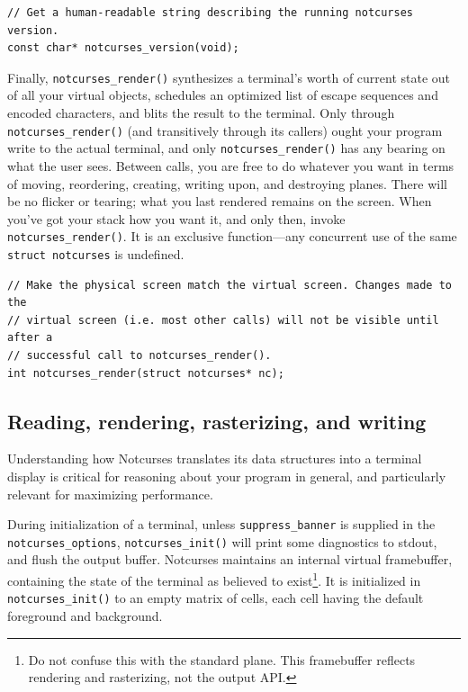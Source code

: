 \documentclass[letterpaper,10pt]{article}
\begin{document}
\begin{listing}[!htbp]
\begin{verbatim}
// Get a human-readable string describing the running notcurses version.
const char* notcurses_version(void);
\end{verbatim}
\end{listing}

Finally, \texttt{notcurses\_render()} synthesizes a terminal's worth of current
state out of all your virtual objects, schedules an optimized list of escape
sequences and encoded characters, and blits the result to the terminal. Only
through \texttt{notcurses\_render()} (and transitively through its callers) ought
your program write to the actual terminal, and only \texttt{notcurses\_render()}
has any bearing on what the user sees. Between calls, you are free to do whatever
you want in terms of moving, reordering, creating, writing upon, and destroying
planes. There will be no flicker or tearing; what you last rendered remains on
the screen. When you've got your stack how you want it, and only then, invoke
\texttt{notcurses\_render()}. It is an exclusive function---any concurrent use
of the same \texttt{struct notcurses} is undefined.

\begin{listing}[!htbp]
\begin{verbatim}
// Make the physical screen match the virtual screen. Changes made to the
// virtual screen (i.e. most other calls) will not be visible until after a
// successful call to notcurses_render().
int notcurses_render(struct notcurses* nc);
\end{verbatim}
\end{listing}

\subsection{Reading, rendering, rasterizing, and writing}
\label{sec:rendering}

Understanding how Notcurses translates its data structures into a terminal
display is critical for reasoning about your program in general, and particularly
relevant for maximizing performance.

During initialization of a terminal, unless \texttt{suppress\_banner} is supplied
in the \texttt{notcurses\_options}, \texttt{notcurses\_init()} will print some
diagnostics to stdout, and flush the output buffer. Notcurses maintains an
internal virtual framebuffer, containing the state of the terminal as believed
to exist\footnote{Do not confuse this with the standard plane. This framebuffer
reflects rendering and rasterizing, not the output API.}. It is initialized in
\texttt{notcurses\_init()} to an empty matrix of cells, each cell having the
default foreground and background.
\end{document}
